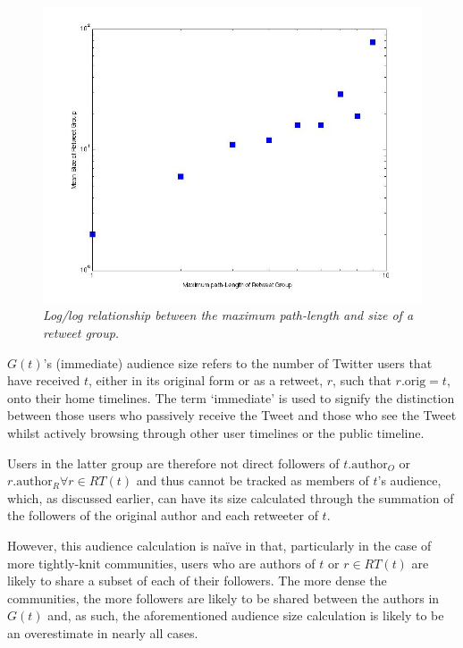 \begin{figure}[h]
\centering
\includegraphics[scale=0.5]{3.Chapter1/Media/retweets-pathlength.jpg} 
\caption{\textit{Log/log relationship between the maximum path-length and size of a retweet group.}}
\label{fig:totalretweets-pathlength}
\end{figure}

$G(t)$'s (immediate) audience size refers to the number of Twitter users that have received $t$, either in its original form or as a retweet, $r$, such that $r.\textrm{orig} = t$, onto their home timelines. The term `immediate' is used to signify the distinction between those users who passively receive the Tweet and those who see the Tweet whilst actively browsing through other user timelines or the public timeline.

Users in the latter group are therefore not direct followers of $t.\textrm{author}_O$ or $r.\textrm{author}_R \forall r \in RT(t)$ and thus cannot be tracked as members of $t$'s audience, which, as discussed earlier, can have its size calculated through the summation of the followers of the original author and each retweeter of $t$.

However, this audience calculation is naïve in that, particularly in the case of more tightly-knit communities, users who are authors of $t$ or $r \in RT(t)$ are likely to share a subset of each of their followers. The more dense the communities, the more followers are likely to be shared between the authors in $G(t)$ and, as such, the aforementioned audience size calculation is likely to be an overestimate in nearly all cases.

